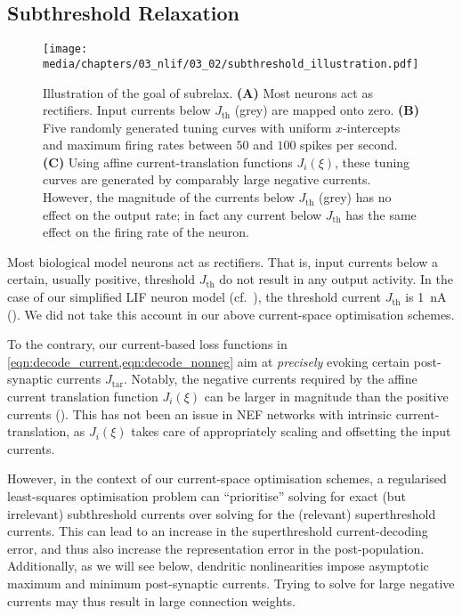 \subsection{Subthreshold Relaxation}
\label{sec:nef_subthreshold}

\begin{figure}
	\texttt{[image: media/chapters/03\_nlif/03\_02/subthreshold\_illustration.pdf]}%
	{\label{fig:subthreshold_illustration_a}}%
	{\label{fig:subthreshold_illustration_b}}%
	{\label{fig:subthreshold_illustration_c}}%
	\caption[Illustration of the goal of subthreshold relaxation]{Illustration of the goal of \gls{subrelax}.
	\textbf{(A)} Most neurons act as rectifiers. Input currents below $J_\mathrm{th}$ (grey) are mapped onto zero.
	\textbf{(B)} Five randomly generated tuning curves with uniform $x$-intercepts and maximum firing rates between $50$ and $100$ spikes per second.
	\textbf{(C)} Using affine current-translation functions $J_i(\xi)$, these tuning curves are generated by comparably large negative currents. However, the magnitude of the currents below $J_\mathrm{th}$ (grey) has no effect on the output rate; in fact any current below $J_\mathrm{th}$ has the same effect on the firing rate of the neuron.
	}
\end{figure}

Most biological model neurons act as rectifiers.
That is, input currents below a certain, usually positive, threshold $J_\mathrm{th}$ do not result in any output activity.
In the case of our simplified LIF neuron model (cf.~), the threshold current $J_\mathrm{th}$ is \SI{1}{\nano\ampere} ().
We did not take this account in our above current-space optimisation schemes.

To the contrary, our current-based loss functions in \cref{eqn:decode_current,eqn:decode_nonneg} aim at \emph{precisely} evoking certain post-synaptic currents $J_\mathrm{tar}$.
Notably, the negative currents required by the affine current translation function $J_i(\xi)$ can be larger in magnitude than the positive currents ().
This has not been an issue in NEF networks with intrinsic current-translation, as $J_i(\xi)$ takes care of appropriately scaling and offsetting the input currents.

However, in the context of our current-space optimisation schemes, a regularised least-squares optimisation problem can \enquote{prioritise} solving for exact (but irrelevant) subthreshold currents over solving for the (relevant) superthreshold currents.
This can lead to an increase in the superthreshold current-decoding error, and thus also increase the representation error in the post-population.
Additionally, as we will see below, dendritic nonlinearities impose asymptotic maximum and minimum post-synaptic currents.
Trying to solve for large negative currents may thus result in large connection weights.

